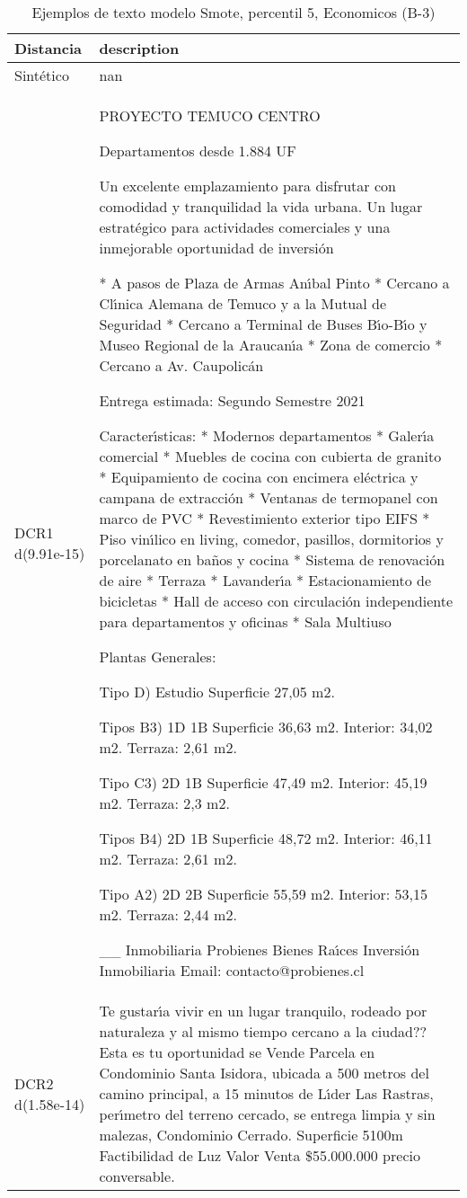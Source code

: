 \begin{table}[H]
\centering
\fontsize{10}{14}\selectfont
\caption{Ejemplos de texto modelo Smote, percentil 5, Economicos (B-3)}
\label{table-example-economicos-b-3-smote-enc-5p-text}
\begin{tabular}{|l|m{35em}|}
\hline
\rowcolor[gray]{0.8}
Distancia & description \\
\hline Sintético & nan \\
\hline DCR1 d(9.91e-15) & PROYECTO TEMUCO CENTRO

Departamentos desde 1.884 UF

Un excelente emplazamiento para disfrutar con comodidad y tranquilidad la vida urbana.
Un lugar estrat\'egico para actividades comerciales y una inmejorable oportunidad de inversi\'on

* A pasos de Plaza de Armas An{\'\i}bal Pinto
* Cercano a Cl{\'\i}nica Alemana de Temuco y a la Mutual de Seguridad
* Cercano a Terminal de Buses B{\'\i}o-B{\'\i}o y Museo Regional de la Araucan{\'\i}a
* Zona de comercio
* Cercano a Av. Caupolic\'an


Entrega estimada: Segundo Semestre 2021

Caracter{\'\i}sticas:
* Modernos departamentos
* Galer{\'\i}a comercial
* Muebles de cocina con cubierta de granito
* Equipamiento de cocina con encimera el\'ectrica y campana de extracci\'on
* Ventanas de termopanel con marco de PVC
* Revestimiento exterior tipo EIFS
* Piso vin{\'\i}lico en living, comedor, pasillos, dormitorios y porcelanato en ba\~nos y cocina
* Sistema de renovaci\'on de aire
* Terraza
* Lavander{\'\i}a
* Estacionamiento de bicicletas
* Hall de acceso con circulaci\'on independiente para departamentos y oficinas
* Sala Multiuso


Plantas Generales:

Tipo D) Estudio
Superficie 27,05 m2.

Tipos B3) 1D 1B
Superficie 36,63 m2. Interior: 34,02 m2. Terraza: 2,61 m2.

Tipo C3) 2D 1B
Superficie 47,49 m2. Interior: 45,19 m2. Terraza: 2,3 m2.

Tipos B4) 2D 1B
Superficie 48,72 m2. Interior: 46,11 m2. Terraza: 2,61 m2.

Tipo A2) 2D 2B
Superficie 55,59 m2. Interior: 53,15 m2. Terraza: 2,44 m2.



 \_\_ 
Inmobiliaria Probienes
 Bienes Ra{\'\i}ces
Inversi\'on Inmobiliaria 
Email: contacto@probienes.cl \\
\hline DCR2 d(1.58e-14) & Te gustar{\'\i}a vivir en un lugar tranquilo, rodeado por naturaleza y al mismo tiempo cercano a la ciudad?? Esta es tu oportunidad se Vende Parcela en Condominio Santa Isidora, ubicada a 500 metros del camino principal, a 15 minutos de L{\'\i}der Las Rastras, per{\'\i}metro del terreno cercado, se entrega limpia y sin malezas, Condominio Cerrado.  Superficie 5100m Factibilidad de Luz  Valor Venta \$55.000.000 precio conversable. \\
\hline
\end{tabular}
\end{table}
